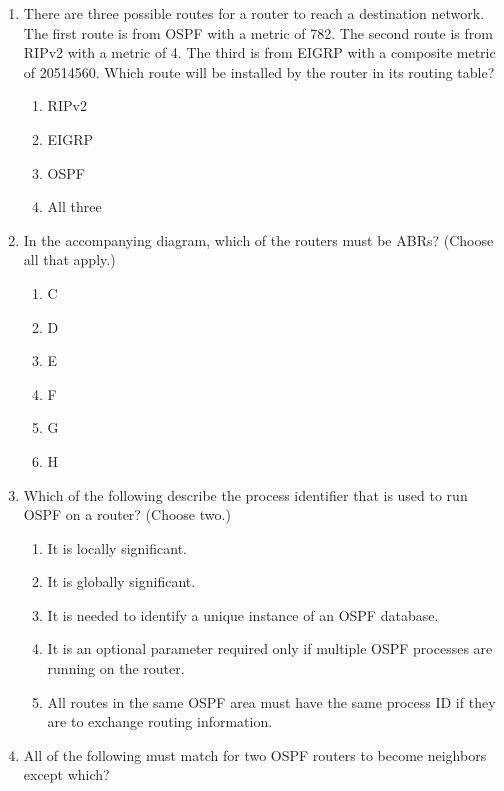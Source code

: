 \begin{enumerate}
\item
  There are three possible routes for a router to reach a destination
  network. The first route is from OSPF with a metric of 782. The second
  route is from RIPv2 with a metric of 4. The third is from EIGRP with a
  composite metric of 20514560. Which route will be installed by the
  router in its routing table?

  \begin{enumerate}
  \def\labelenumii{\Alph{enumii}.}
    \item
    RIPv2
  \item
    EIGRP
  \item
    OSPF
  \item
    All three
  \end{enumerate}
\item
  In the accompanying diagram, which of the routers must be ABRs?
  (Choose all that apply.)

  \begin{figure}
  \centering
  \caption{}
  \end{figure}

  \begin{enumerate}
  \def\labelenumii{\Alph{enumii}.}
    \item
    C
  \item
    D
  \item
    E
  \item
    F
  \item
    G
  \item
    H
  \end{enumerate}
\item
  \protect\hypertarget{c18.xhtmlux5cux23Page_777}{}{}Which of the
  following describe the process identifier that is used to run OSPF on
  a router? (Choose two.)

  \begin{enumerate}
  \def\labelenumii{\Alph{enumii}.}
    \item
    It is locally significant.
  \item
    It is globally significant.
  \item
    It is needed to identify a unique instance of an OSPF database.
  \item
    It is an optional parameter required only if multiple OSPF processes
    are running on the router.
  \item
    All routes in the same OSPF area must have the same process ID if
    they are to exchange routing information.
  \end{enumerate}
\item
  All of the following must match for two OSPF routers to become
  neighbors except which?


\end{enumerate}
